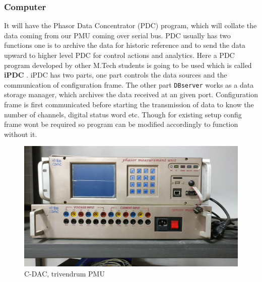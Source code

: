 \subsubsection{Computer}
It will have the Phasor Data Concentrator (PDC) program, which will collate the data coming from our PMU coming over serial bus. PDC  usually has two functions one is to archive the data for historic reference and to send the data upward to higher level PDC for control actions and analytics. Here a PDC program developed by other M.Tech students is going to be used which is called \textbf{iPDC} \cite{site:ipdc}. iPDC has two parts, one part controls the data sources and the communication of configuration frame. The other part \texttt{DBserver} works as a data storage manager, which archives the data received at an given port. Configuration frame is first communicated before starting the transmission of data to know the number of channels, digital status word etc.
Though for existing setup config frame wont be required so program can be modified accordingly to function without it.

\begin{figure}[t]
\includegraphics[width=\textwidth]{fig/cdac_pmu.jpg}
\caption{C-DAC, trivendrum PMU}
\label{fig:cdac_pmu}
\end{figure}
